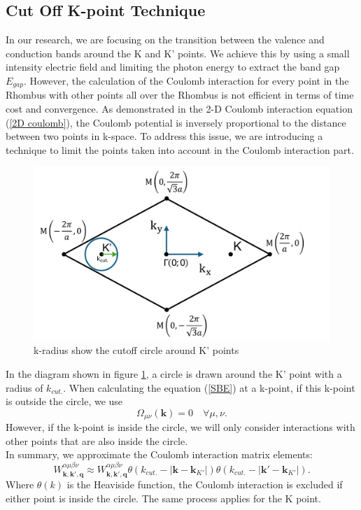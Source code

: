 \documentclass[12pt,english,a4paper]{article}
\begin{document}
\subsection{Cut Off K-point Technique}
\quad In our research, we are focusing on the transition between the valence and conduction bands around the K and K' points. We achieve this by using a small intensity electric field and limiting the photon energy to extract the band gap $E_{gap}$. However, the calculation of the Coulomb interaction for every point in the Rhombus with other points all over the Rhombus is not efficient in terms of time cost and convergence. As demonstrated in the 2-D Coulomb interaction equation (\ref{2D coulomb}), the Coulomb potential is inversely proportional to the distance between two points in k-space. To address this issue, we are introducing a technique to limit the points taken into account in the Coulomb interaction part.\\\null
\begin{figure}[ht]
	\begin{center}
		\includegraphics[width = 0.5 \linewidth]{Images/kcutoff.pdf}
		\caption{k-radius show the cutoff circle around K' points}
		\label{k cutoff}
	\end{center}
\end{figure}
\quad In the diagram shown in figure \ref{k cutoff}, a circle is drawn around the K' point with a radius of $k_{cut.}$. When calculating the equation (\ref{SBE}) at a k-point, if this k-point is outside the circle, we use
$$\Omega_{\mu \nu}(\textbf{k}) = 0 \quad \forall \mu,\nu.$$
\quad However, if the k-point is inside the circle, we will only consider interactions with other points that are also inside the circle.\\\null
\quad In summary, we approximate the Coulomb interaction matrix elements:
$$W^{\alpha \mu \beta \nu}_{\textbf{k},\textbf{k}',\textbf{q}} \approx W^{\alpha \mu \beta \nu}_{\textbf{k},\textbf{k}',\textbf{q}} \theta(k_{cut.} - |\textbf{k} - \textbf{k}_{K'}|) \theta(k_{cut.} - |\textbf{k}' - \textbf{k}_{K'}|).$$
\quad Where $\theta(k)$ is the Heaviside function, the Coulomb interaction is excluded if either point is inside the circle. The same process applies for the K point.
\end{document}
